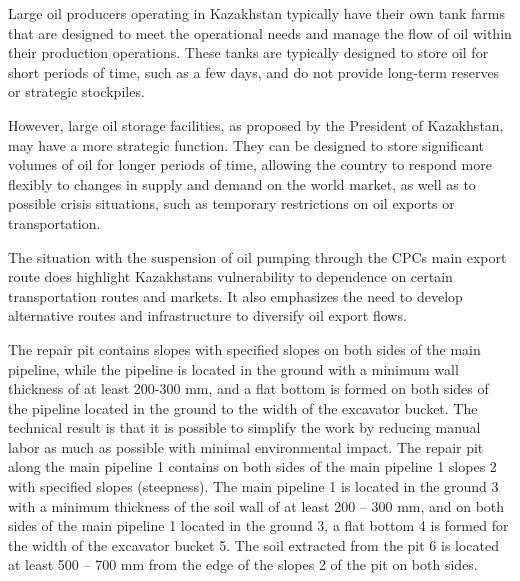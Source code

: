Large oil producers operating in Kazakhstan typically have their own
tank farms that are designed to meet the operational needs and manage
the flow of oil within their production operations. These tanks are
typically designed to store oil for short periods of time, such as a few
days, and do not provide long-term reserves or strategic stockpiles.

However, large oil storage facilities, as proposed by the President of
Kazakhstan, may have a more strategic function. They can be designed to
store significant volumes of oil for longer periods of time, allowing
the country to respond more flexibly to changes in supply and demand on
the world market, as well as to possible crisis situations, such as
temporary restrictions on oil exports or transportation.

The situation with the suspension of oil pumping through the
CPC\textquotesingle s main export route does highlight
Kazakhstan\textquotesingle s vulnerability to dependence on certain
transportation routes and markets. It also emphasizes the need to
develop alternative routes and infrastructure to diversify oil export
flows.

The repair pit contains slopes with specified slopes on both sides of
the main pipeline, while the pipeline is located in the ground with a
minimum wall thickness of at least 200-300 mm, and a flat bottom is
formed on both sides of the pipeline located in the ground to the width
of the excavator bucket. The technical result is that it is possible to
simplify the work by reducing manual labor as much as possible with
minimal environmental impact. The repair pit along the main pipeline 1
contains on both sides of the main pipeline 1 slopes 2 with specified
slopes (steepness). The main pipeline 1 is located in the ground 3 with
a minimum thickness of the soil wall of at least 200 -- 300 mm, and on
both sides of the main pipeline 1 located in the ground 3, a flat bottom
4 is formed for the width of the excavator bucket 5. The soil extracted
from the pit 6 is located at least 500 -- 700 mm from the edge of the
slopes 2 of the pit on both sides.

